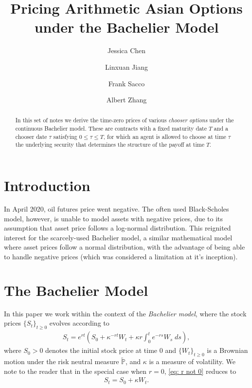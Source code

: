 \documentclass[reqno]{amsart}
\title{Pricing Arithmetic Asian Options under the Bachelier Model} %
\author{Jessica Chen}
\author{Linxuan Jiang}
\author{Frank Sacco}
\author{Albert Zhang}
\begin{document}
\begin{abstract}
     In this set of notes we derive the time-zero prices of various \emph{chooser options} under the continuous Bachelier model.
     These are contracts with a fixed maturity date $T$ and a chooser date $\tau$ satisfying $0 \le \tau \le T$, for which an agent is allowed to choose at time $\tau$ the underlying security that determines the structure of the payoff at time $T$.  
\end{abstract}


\maketitle  
\tableofcontents

\section{Introduction}
In April 2020, oil futures price went negative.
The often used Black-Scholes model, however, is unable to model assets with negative prices, due to its assumption that asset price follows a log-normal distribution.
This reignited interest for the scarcely-used Bachelier model, a similar mathematical model where asset prices follow a normal distribution, with the advantage of being able to handle negative prices (which was considered a limitation at it's inception).

\section{The Bachelier Model}
In this paper we work within the context of the \emph{Bachelier model}, where the stock prices $\{S_t\}_{t \ge 0}$ evolves according to 
\begin{align}\label{eq: r not 0}
	 S_t = e^{rt} \left( S_0 + \kappa^{-rt}W_t + \kappa r \int_0^t e^{-rs} W_s \; ds \right),
\end{align}
where $S_0 > 0$ denotes the initial stock price at time 0 and $\{W_t\}_{t \ge 0}$ is a Brownian motion under the risk neutral measure $\tilde{\mathbb{P}}$, and $\kappa$ is a measure of volatility.
We note to the reader that in the special case when $r = 0$, \eqref{eq: r not 0} reduces to 
\begin{align}\label{eq: r=0}
      S_t = S_0 + \kappa W_t. 
\end{align}
\end{document}
